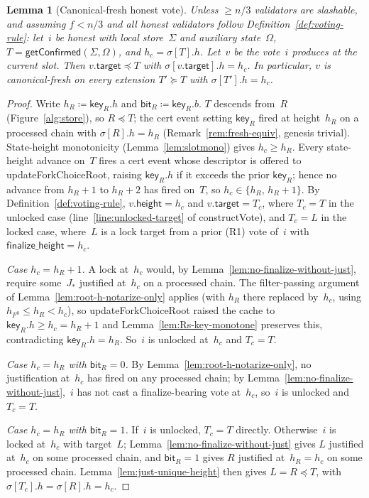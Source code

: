 \ifx\litemode\undefined\documentclass{article}\fi
\newcommand{\target}{\mathsf{target}}
\newcommand{\height}{\mathsf{height}}
\newcommand{\finalizeHeight}{\mathsf{finalize\_height}}
\newcommand{\key}{\mathsf{key}}
\newcommand{\bit}{\mathsf{bit}}
\newcommand{\constructVote}{\textsf{constructVote}\xspace}
\newcommand{\updateForkChoiceRoot}{\textsf{updateForkChoiceRoot}\xspace}
\newcommand{\getConfirmed}{\textsf{getConfirmed}\xspace}
\theoremstyle{plain}
\newtheorem{lemma}{Lemma}
\theoremstyle{definition}
\theoremstyle{remark}
\begin{document}
\begin{lemma}[Canonical-fresh honest vote]\label{lem:canonical-fresh-honest-vote}
Unless $\geq n/3$ validators are slashable, and assuming $f < n/3$ and all honest validators follow Definition~\ref{def:voting-rule}: let~$i$ be honest with local store~$\Sigma$ and auxiliary state~$\Omega$, $T = \getConfirmed(\Sigma, \Omega)$, and $h_c = \sigma[T].h$.
Let~$v$ be the vote~$i$ produces at the current slot.
Then $v.\target \preceq T$ with $\sigma[v.\target].h = h_c$.
In particular, $v$ is canonical-fresh on every extension $T' \succeq T$ with $\sigma[T'].h = h_c$.
\end{lemma}

\begin{proof}
Write $h_R \coloneqq \key_R.h$ and $\bit_R \coloneqq \key_R.b$.
$T$ descends from~$R$ (Figure~\ref{alg:store}), so $R \preceq T$; the cert event setting $\key_R$ fired at height~$h_R$ on a processed chain with $\sigma[R].h = h_R$ (Remark~\ref{rem:fresh-equiv}, genesis trivial).
State-height monotonicity (Lemma~\ref{lem:slotmono}) gives $h_c \geq h_R$.
Every state-height advance on~$T$ fires a cert event whose descriptor is offered to \updateForkChoiceRoot, raising $\key_R.h$ if it exceeds the prior $\key_R$; hence no advance from $h_R + 1$ to $h_R + 2$ has fired on~$T$, so $h_c \in \{h_R,\, h_R + 1\}$.
By Definition~\ref{def:voting-rule}, $v.\height = h_c$ and $v.\target = T_c$, where $T_c = T$ in the unlocked case (line~\ref{line:unlocked-target} of \constructVote{}), and $T_c = L$ in the locked case, where~$L$ is a lock target from a prior (R1) vote of~$i$ with $\finalizeHeight = h_c$.

\emph{Case $h_c = h_R + 1$.}
A lock at~$h_c$ would, by Lemma~\ref{lem:no-finalize-without-just}, require some~$J_\ast$ justified at~$h_c$ on a processed chain.
The filter-passing argument of Lemma~\ref{lem:root-h-notarize-only} applies (with $h_R$ there replaced by~$h_c$, using $h_{F^0} \leq h_R < h_c$), so \updateForkChoiceRoot raised the cache to $\key_R.h \geq h_c = h_R + 1$ and Lemma~\ref{lem:Rs-key-monotone} preserves this, contradicting $\key_R.h = h_R$.
So~$i$ is unlocked at~$h_c$ and $T_c = T$.

\emph{Case $h_c = h_R$ with $\bit_R = 0$.}
By Lemma~\ref{lem:root-h-notarize-only}, no justification at~$h_c$ has fired on any processed chain; by Lemma~\ref{lem:no-finalize-without-just},~$i$ has not cast a finalize-bearing vote at~$h_c$, so~$i$ is unlocked and $T_c = T$.

\emph{Case $h_c = h_R$ with $\bit_R = 1$.}
If~$i$ is unlocked, $T_c = T$ directly.
Otherwise~$i$ is locked at~$h_c$ with target~$L$; Lemma~\ref{lem:no-finalize-without-just} gives $L$ justified at~$h_c$ on some processed chain, and $\bit_R = 1$ gives $R$ justified at~$h_R = h_c$ on some processed chain.
Lemma~\ref{lem:just-unique-height} then gives $L = R \preceq T$, with $\sigma[T_c].h = \sigma[R].h = h_c$.
\end{proof}
\end{document}
